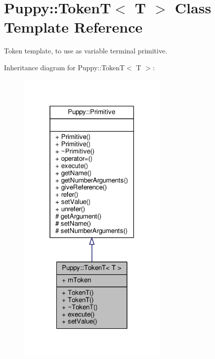 \hypertarget{classPuppy_1_1TokenT}{}\section{Puppy\+:\+:Token\+T$<$ T $>$ Class Template Reference}
\label{classPuppy_1_1TokenT}


Token template, to use as variable terminal primitive.  




Inheritance diagram for Puppy\+:\+:Token\+T$<$ T $>$\+:
\nopagebreak
\begin{figure}[H]
\begin{center}
\leavevmode
\includegraphics[width=207pt]{classPuppy_1_1TokenT__inherit__graph}
\end{center}
\end{figure}


